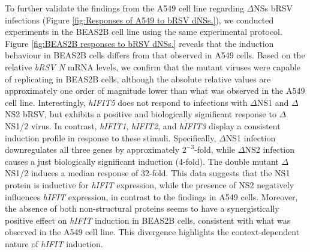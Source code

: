 To further validate the findings from the A549 cell line regarding \(\Delta\)NSs bRSV infections (Figure \ref{fig:Responses of A549 to bRSV dNSs.}), we conducted experiments in the BEAS2B cell line using the same experimental protocol. Figure \ref{fig:BEAS2B responses to bRSV dNSs.} reveals that the induction behaviour in BEAS2B cells differs from that observed in A549 cells. Based on the relative \textit{bRSV N} mRNA levels, we confirm that the mutant viruses were capable of replicating in BEAS2B cells, although the absolute relative values are approximately one order of magnitude lower than what was observed in the A549 cell line. Interestingly, \textit{hIFIT5} does not respond to infections with \(\Delta\)NS1 and \(\Delta\)NS2 bRSV, but exhibits a positive and biologically significant response to \(\Delta\)NS1/2 virus. In contrast, \textit{hIFIT1}, \textit{hIFIT2}, and \textit{hIFIT3} display a consistent induction profile in response to these stimuli. Specifically, \(\Delta\)NS1 infection downregulates all three genes by approximately \(2^{-3}\)-fold, while \(\Delta\)NS2 infection causes a just biologically significant induction (4-fold). The double mutant \(\Delta\)NS1/2 induces a median response of 32-fold. This data suggests that the NS1 protein is inductive for \textit{hIFIT} expression, while the presence of NS2 negatively influences \textit{hIFIT} expression, in contrast to the findings in A549 cells. Moreover, the absence of both non-structural proteins seems to have a synergistically positive effect on \textit{hIFIT} induction in BEAS2B cells, consistent with what was observed in the A549 cell line. This divergence highlights the context-dependent nature of \textit{hIFIT} induction.
